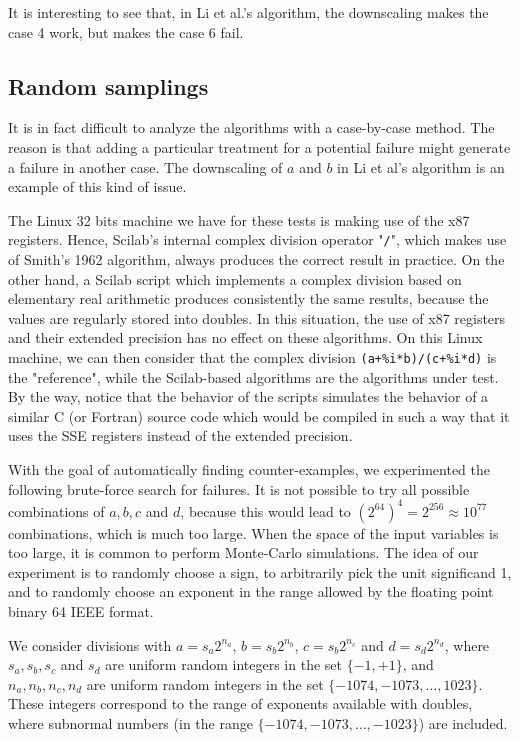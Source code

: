 \documentclass{paper}
\newcommand{\scivar}[1]{\texttt{#1}}
\begin{document}
It is interesting to see that, in Li et al.'s algorithm, the downscaling 
makes the case 4 work, but makes the case 6 fail. 



\subsection{Random samplings}
\label{section-randomsamplings}

It is in fact difficult to analyze the algorithms with a case-by-case method. 
The reason is that adding a particular treatment for a potential 
failure might generate a failure in another case. 
The downscaling of $a$ and $b$ in Li et al's algorithm is an example 
of this kind of issue. 

The Linux 32 bits machine we have for these tests is making use of the x87 registers. 
Hence, Scilab's internal complex division operator "\scivar{/}", 
which makes use of Smith's 1962 algorithm, always produces the correct result in practice.  
On the other hand, a Scilab script which implements a complex division 
based on elementary real arithmetic produces 
consistently the same results, because the values are regularly stored into 
doubles. 
In this situation, the use of x87 registers and their extended precision has 
no effect on these algorithms. 
On this Linux machine, we can then consider that the complex division 
\scivar{(a+\%i*b)/(c+\%i*d)} is the "reference", while the 
Scilab-based algorithms are the algorithms under test. 
By the way, notice that the behavior of the scripts simulates the behavior of a similar 
C (or Fortran) source code which would be compiled in such a way that it uses the 
SSE registers instead of the extended precision.

With the goal of automatically finding counter-examples, we experimented the following 
brute-force search for failures. 
It is not possible to try all possible combinations of $a, b, c$ and $d$, because 
this would lead to $(2^{64})^4=2^{256}\approx 10^{77}$ combinations, which 
is much too large. 
When the space of the input variables is 
too large, it is common to perform Monte-Carlo simulations. 
The idea of our experiment is to randomly choose a sign, 
to arbitrarily pick the unit significand 1, 
and to randomly choose an exponent in the range allowed by the 
floating point binary 64 IEEE format. 

We consider divisions with $a=s_a 2^{n_a}$, $b=s_b 2^{n_b}$, $c=s_b 2^{n_c}$ and 
$d=s_d 2^{n_d}$, where $s_a,s_b,s_c$ and $s_d$ are 
uniform random integers in the set $\{-1,+1\}$, and 
$n_a,n_b,n_c,n_d$ are uniform random integers in the 
set $\{-1074,-1073,\ldots,1023\}$.
These integers correspond to the range of exponents available 
with doubles, where subnormal numbers (in the range $\{-1074,-1073,\ldots,-1023\}$) 
are included. 
\end{document}

